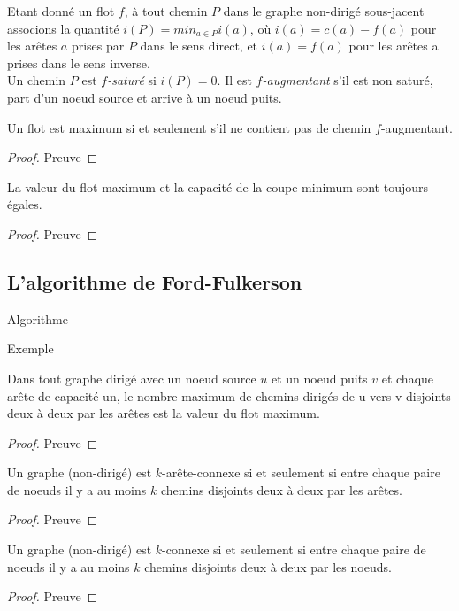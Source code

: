 \begin{mydef}
  Etant donné un flot $f$, à tout chemin $P$ dans le graphe non-dirigé sous-jacent associons la quantité $i(P) = min_{a \in P} i(a)$, où $i(a) = c(a) − f(a)$ pour les arêtes $a$ prises par $P$ dans le sens direct, et $i(a) = f (a)$ pour les arêtes a prises dans le sens inverse.\\
  Un chemin $P$ est \emph{$f$-saturé} si $i(P) = 0$. Il est \emph{$f$-augmentant} s'il est non saturé, part d'un noeud source et arrive à un noeud puits.
\end{mydef}

\begin{mytheo}
  Un flot est maximum si et seulement s'il ne contient pas de chemin $f$-augmentant.
  \begin{proof}
     Preuve \addTODO
  \end{proof}
\end{mytheo}

\begin{mytheo}
  La valeur du flot maximum et la capacité de la coupe minimum sont toujours égales.
  \begin{proof}
     Preuve \addTODO
  \end{proof}
\end{mytheo}

\subsection{L'algorithme de Ford-Fulkerson}
\begin{myalgo}
  Algorithme \addTODO
\end{myalgo}

\begin{myexem}
  Exemple \addTODO
\end{myexem}

\begin{mylem}
  Dans tout graphe dirigé avec un noeud source $u$ et un noeud puits $v$ et chaque arête de capacité un, le nombre maximum de chemins dirigés de u vers v disjoints deux à deux par les arêtes est la valeur du flot maximum.
  \begin{proof}
     Preuve \addTODO
  \end{proof}
\end{mylem}

\begin{mytheo}
  Un graphe (non-dirigé) est $k$-arête-connexe si et seulement si entre chaque paire de noeuds il y a au moins $k$ chemins disjoints deux à deux par les arêtes.
  \begin{proof}
     Preuve \addTODO
  \end{proof}
\end{mytheo}

\begin{mytheo} [Menger]
  Un graphe (non-dirigé) est $k$-connexe si et seulement si entre chaque paire de noeuds il y a au moins $k$ chemins disjoints deux à deux par les noeuds.
  \begin{proof}
     Preuve \addTODO
  \end{proof}
\end{mytheo}
